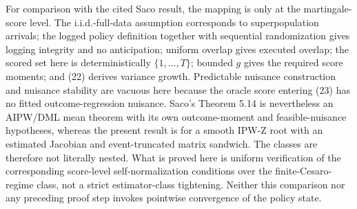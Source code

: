 For comparison with the cited Saco result, the mapping is only at the martingale-score level. The i.i.d.-full-data assumption corresponds to superpopulation arrivals; the logged policy definition together with sequential randomization gives logging integrity and no anticipation; uniform overlap gives executed overlap; the scored set here is deterministically \(\{1,\ldots,T\}\); bounded \(g\) gives the required score moments; and (22) derives variance growth. Predictable nuisance construction and nuisance stability are vacuous here because the oracle score entering (23) has no fitted outcome-regression nuisance. Saco's Theorem 5.14 is nevertheless an AIPW/DML mean theorem with its own outcome-moment and feasible-nuisance hypotheses, whereas the present result is for a smooth IPW-Z root with an estimated Jacobian and event-truncated matrix sandwich. The classes are therefore not literally nested. What is proved here is uniform verification of the corresponding score-level self-normalization conditions over the finite-Cesaro-regime class, not a strict estimator-class tightening. Neither this comparison nor any preceding proof step invokes pointwise convergence of the policy state.